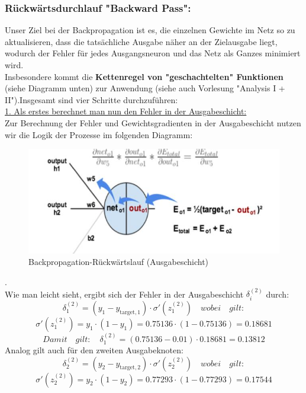 \documentclass[12pt]{article}
\begin{document}
\subsubsection{Rückwärtsdurchlauf "Backward Pass":}
Unser Ziel bei der Backpropagation ist es, die einzelnen Gewichte im Netz so zu aktualisieren, dass die tatsächliche Ausgabe näher an der Zielausgabe liegt, wodurch der Fehler für jedes Ausgangsneuron und das Netz als Ganzes minimiert wird.\\
Insbesondere kommt die \textbf{Kettenregel von "geschachtelten" Funktionen} (siehe Diagramm unten) zur Anwendung (siehe auch Vorlesung "Analysis I + II").Insgesamt sind vier Schritte durchzuführen:\\[0.3cm]
%
\underline{1. Als erstes berechnet man nun den Fehler in der Ausgabeschicht:} \\[0.2cm]
Zur Berechnung der Fehler und Gewichtsgradienten in der Ausgabeschicht nutzen wir die Logik der Prozesse im folgenden Diagramm:\\[6.5cm]
\begin{figure}[h]
  \centering
  \hspace*{-0.5cm}
  \includegraphics[width=1.1\textwidth]{Backpropagation-BP-01} 
  \caption{Backpropagation-Rückwärtslauf (Ausgabeschicht)}
  \label{fig:BP-Rückw-01}
\end{figure}.\\[4.5cm]
%
Wie man leicht sieht, ergibt sich der Fehler in der Ausgabeschicht $
\delta^{(2)}_i $ durch:\\
\[
\delta^{(2)}_1 = (y_1 - y_{\text{target},1}) \cdot \sigma'(z^{(2)}_1) \quad wobei \quad gilt: \] 
\[
\sigma'(z^{(2)}_1) = y_1 \cdot (1 - y_1) = 0.75136 \cdot (1 - 0.75136) = 0.18681
\]
\[
Damit \quad gilt: \quad \delta^{(2)}_1 = (0.75136 - 0.01) \cdot 0.18681 = 0.13812
\]
Analog gilt auch für den zweiten Ausgabeknoten:
\[
\delta^{(2)}_2 = (y_2 - y_{\text{target},2}) \cdot \sigma'(z^{(2)}_2)\quad wobei \quad gilt: \]
\[
\sigma'(z^{(2)}_2) = y_2 \cdot (1 - y_2) = 0.77293 \cdot (1 - 0.77293) = 0.17544
\]
\end{document}
